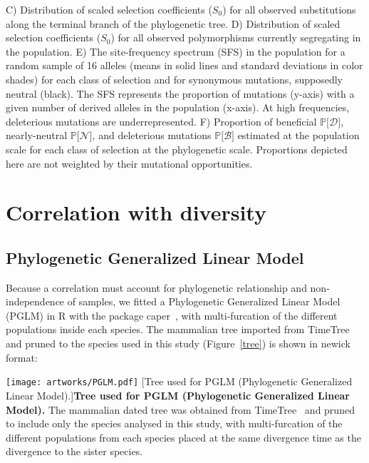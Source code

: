 \documentclass{article}
\newcommand{\proba}{\mathbb{P}}
\newcommand{\Sphy}{S_{0}}
\newcommand{\SpopDel}{\mathcal{D}}
\newcommand{\SpopNeu}{\mathcal{N}}
\newcommand{\SpopBen}{\mathcal{B}}
\newcommand{\ProbaPopDel}{\proba{[} \SpopDel]}
\newcommand{\ProbaPopNeu}{\proba{[} \SpopNeu ]}
\newcommand{\ProbaPopBen}{\proba{[} \SpopBen ]}
\begin{document}
\begin{center}
{        C) Distribution of scaled selection coefficients ($\Sphy$) for all observed substitutions along the terminal branch of the phylogenetic tree.
        D) Distribution of scaled selection coefficients ($\Sphy$) for all observed polymorphisms currently segregating in the population.
        E) The site-frequency spectrum (SFS) in the population for a random sample of 16 alleles (means in solid lines and standard deviations in color shades) for each class of selection and for synonymous mutations, supposedly neutral (black). The SFS represents the proportion of mutations (y-axis) with a given number of derived alleles in the population (x-axis). At high frequencies, deleterious mutations are underrepresented.
        F) Proportion of beneficial $\ProbaPopDel$, nearly-neutral $\ProbaPopNeu$, and deleterious mutations $\ProbaPopBen$  estimated at the population scale for each class of selection at the phylogenetic scale. Proportions depicted here are not weighted by their mutational opportunities.}
        \label{dfe-sfs}
    \end{center}

    \newpage
    \section{Correlation with diversity}

    \subsection{Phylogenetic Generalized Linear Model}

    Because a correlation must account for phylogenetic relationship and non-independence of samples, we fitted a Phylogenetic Generalized Linear Model (PGLM) in R with the package caper~\cite{orme_caper_2013}, with multi-furcation of the different populations inside each species.
    The mammalian tree imported from TimeTree~\cite{kumar_timetree_2017} and pruned to the species used in this study (Figure~\ref{tree}) is shown in newick format:

    

    \begin{center}
        \texttt{[image: artworks/PGLM.pdf]}
        [Tree used for PGLM (Phylogenetic Generalized Linear Model).]{\textbf{Tree used for PGLM (Phylogenetic Generalized Linear Model).} The mammalian dated tree was obtained from TimeTree~\cite{kumar_timetree_2017} and pruned to include only the species analysed in this study, with multi-furcation of the different populations from each species placed at the same divergence time as the divergence to the sister species.}
        \label{tree}
    \end{center}
\end{document}
